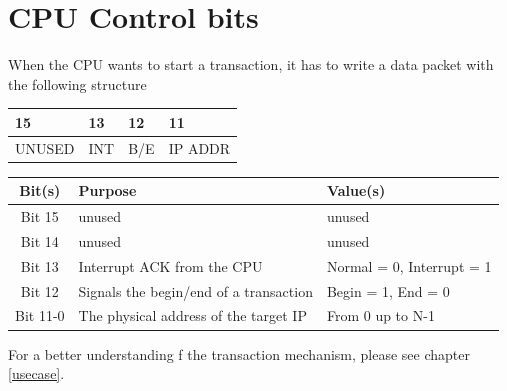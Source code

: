 \section{CPU Control bits } \label{transaction}

	When the CPU wants to start a transaction, it has to write a data packet with the following structure\\
	\begin{center}
	\begin{tabular}{ | l | l |  l | l | }
		
		15  \qquad  \qquad 14 & 13 & 12 & 11 \qquad \qquad 0 \\ \hline
		UNUSED & INT & B/E & IP ADDR\\ \hline
		
		
		\hline
	\end{tabular}
\end{center}

\bigskip
\begin{center}
	\begin{tabular}{ | c | p{7 cm} |  l |}
		\hline
		Bit(s) & Purpose & Value(s)  \\ \hline
		Bit 15 & unused  & unused 
		\\ \hline
		Bit 14 & unused  & unused\\
		\hline
		Bit 13 & Interrupt ACK from the CPU   & Normal = 0, Interrupt  =  1
		\\ \hline
		
		Bit 12 & Signals the begin/end of a transaction & Begin  = 1, End = 0 
		\\ \hline
			
		
			
		Bit 11-0 & The physical address of the target IP &
		From 0 up to N-1  \\
		
		
		
		\hline
	\end{tabular}
\end{center}
For a better understanding f the transaction mechanism, please see chapter \ref{usecase}.
